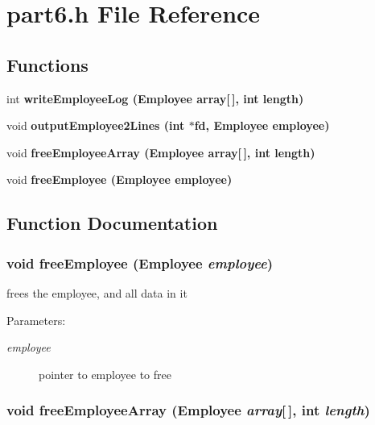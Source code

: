 \section{part6.h File Reference}
\label{part6_8h}
\subsection*{Functions}
\begin{CompactItemize}
\item 
int \bf{write\-Employee\-Log} (\bf{Employee} array[$\,$], int length)
\item 
void \bf{output\-Employee2Lines} (int $\ast$fd, \bf{Employee} employee)
\item 
void \bf{free\-Employee\-Array} (\bf{Employee} array[$\,$], int length)
\item 
void \bf{free\-Employee} (\bf{Employee} employee)
\end{CompactItemize}


\subsection{Function Documentation}
\subsubsection{\setlength{\rightskip}{0pt plus 5cm}void free\-Employee (\bf{Employee} {\em employee})}\label{part6_8h_1382781984017ba4d7c3965bd39535cb}


frees the employee, and all data in it \begin{Desc}
\item[Parameters:]
\begin{description}
\item[{\em employee}]pointer to employee to free \end{description}
\end{Desc}
\subsubsection{\setlength{\rightskip}{0pt plus 5cm}void free\-Employee\-Array (\bf{Employee} {\em array}[$\,$], int {\em length})}\label{part6_8h_0de2fa2b213192c6f4be528258f5f78a}


